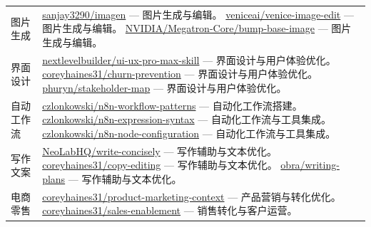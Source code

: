 \documentclass[UTF8,a4paper,12pt]{ctexart}
\begin{document}
\begin{longtable}{p{2.6cm} p{12cm}}
\addlinespace
图片生成 & \href{https://github.com/sanjay3290/ai-skills/tree/main/skills/imagen}{sanjay3290/imagen} — 图片生成与编辑。
  \newline \href{https://github.com/veniceai/skills/tree/main/skills/venice-image-edit}{veniceai/venice-image-edit} — 图片生成与编辑。
  \newline \href{https://github.com/NVIDIA/skills/tree/main/skills/Megatron-Core/bump-base-image}{NVIDIA/Megatron-Core/bump-base-image} — 图片生成与编辑。\\
\addlinespace
界面设计 & \href{https://github.com/nextlevelbuilder/ui-ux-pro-max-skill}{nextlevelbuilder/ui-ux-pro-max-skill} — 界面设计与用户体验优化。
  \newline \href{https://github.com/coreyhaines31/marketingskills/tree/main/skills/churn-prevention}{coreyhaines31/churn-prevention} — 界面设计与用户体验优化。
  \newline \href{https://github.com/phuryn/pm-skills/tree/main/pm-execution/skills/stakeholder-map}{phuryn/stakeholder-map} — 界面设计与用户体验优化。\\
\addlinespace
自动工作流 & \href{https://github.com/czlonkowski/n8n-skills/tree/main/skills/n8n-workflow-patterns}{czlonkowski/n8n-workflow-patterns} — 自动化工作流搭建。
  \newline \href{https://github.com/czlonkowski/n8n-skills/tree/main/skills/n8n-expression-syntax}{czlonkowski/n8n-expression-syntax} — 自动化工作流与工具集成。
  \newline \href{https://github.com/czlonkowski/n8n-skills/tree/main/skills/n8n-node-configuration}{czlonkowski/n8n-node-configuration} — 自动化工作流与工具集成。\\
\addlinespace
写作文案 & \href{https://github.com/NeoLabHQ/context-engineering-kit/tree/master/plugins/docs/skills/write-concisely}{NeoLabHQ/write-concisely} — 写作辅助与文本优化。
  \newline \href{https://github.com/coreyhaines31/marketingskills/tree/main/skills/copy-editing}{coreyhaines31/copy-editing} — 写作辅助与文本优化。
  \newline \href{https://github.com/obra/superpowers/blob/main/skills/writing-plans/SKILL.md}{obra/writing-plans} — 写作辅助与文本优化。\\
\addlinespace
电商零售 & \href{https://github.com/coreyhaines31/marketingskills/tree/main/skills/product-marketing-context}{coreyhaines31/product-marketing-context} — 产品营销与转化优化。
  \newline \href{https://github.com/coreyhaines31/marketingskills/tree/main/skills/sales-enablement}{coreyhaines31/sales-enablement} — 销售转化与客户运营。

\end{longtable}
\end{document}
